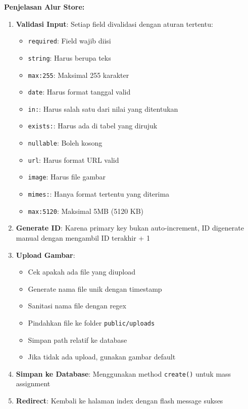 \documentclass[12pt,a4paper]{article}
\begin{document}
\textbf{Penjelasan Alur Store:}
\begin{enumerate}
    \item \textbf{Validasi Input}: Setiap field divalidasi dengan aturan tertentu:
    \begin{itemize}
        \item \texttt{required}: Field wajib diisi
        \item \texttt{string}: Harus berupa teks
        \item \texttt{max:255}: Maksimal 255 karakter
        \item \texttt{date}: Harus format tanggal valid
        \item \texttt{in:}: Harus salah satu dari nilai yang ditentukan
        \item \texttt{exists:}: Harus ada di tabel yang dirujuk
        \item \texttt{nullable}: Boleh kosong
        \item \texttt{url}: Harus format URL valid
        \item \texttt{image}: Harus file gambar
        \item \texttt{mimes:}: Hanya format tertentu yang diterima
        \item \texttt{max:5120}: Maksimal 5MB (5120 KB)
    \end{itemize}
    
    \item \textbf{Generate ID}: Karena primary key bukan auto-increment, ID digenerate manual dengan mengambil ID terakhir + 1
    
    \item \textbf{Upload Gambar}:
    \begin{itemize}
        \item Cek apakah ada file yang diupload
        \item Generate nama file unik dengan timestamp
        \item Sanitasi nama file dengan regex
        \item Pindahkan file ke folder \texttt{public/uploads}
        \item Simpan path relatif ke database
        \item Jika tidak ada upload, gunakan gambar default
    \end{itemize}
    
    \item \textbf{Simpan ke Database}: Menggunakan method \texttt{create()} untuk mass assignment
    
    \item \textbf{Redirect}: Kembali ke halaman index dengan flash message sukses
\end{enumerate}
\end{document}

